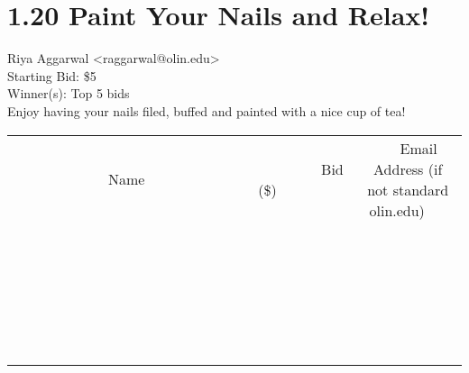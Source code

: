 \documentclass[11pt]{article}
\begin{document}
					\section*{1.20 Paint Your Nails and Relax!}
					Riya Aggarwal <raggarwal@olin.edu> \\
					Starting Bid: \$5 \\
					Winner(s): Top 5 bids \\
					Enjoy having your nails filed, buffed and painted with a nice cup of tea! \\
					[6ex]
					\begin{tabular}{c c c}
						~~~~~~~~~~~~~Name~~~~~~~~~~~~~ & ~~~~~~~~~Bid (\$)~~~~~~~~~ & ~~~Email Address (if not standard olin.edu)~~~ \\
				
 & & \\
\hline
 & & \\
\hline
 & & \\
\hline
 & & \\
\hline
 & & \\
\hline
 & & \\
\hline
 & & \\
\hline
 & & \\
\hline
 & & \\
\hline
 & & \\
\hline
 & & \\
\hline
 & & \\
\hline
 & & \\
\hline
 & & \\
\hline
 & & \\
\hline
 & & \\
\hline
 & & \\
\hline
 & & \\
\hline
 & & \\
\hline
 & & \\
\hline
 & & \\
\hline
 & & \\
\hline
 & & \\
\hline
 & & \\
\hline
 & & \\
\hline
 & & \\
\hline
					\end{tabular}
					\clearpage
				
\end{document}
